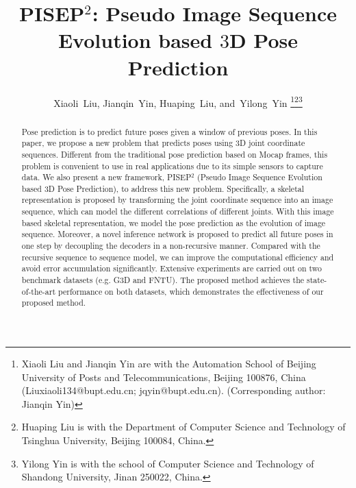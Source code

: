 \documentclass[journal]{IEEEtran}
\begin{document}
\title{PISEP${^2}$: Pseudo Image Sequence Evolution based ${3}$D Pose Prediction}


\author{Xiaoli~Liu,
        Jianqin~Yin,
        Huaping~Liu,
        and~Yilong~Yin \thanks{Xiaoli Liu and Jianqin Yin are with the Automation School of Beijing University of Posts
and Telecommunications, Beijing 100876, China (Liuxiaoli134@bupt.edu.cn; jqyin@bupt.edu.cn). (Corresponding author: Jianqin Yin)}\thanks{Huaping Liu is with the Department of Computer Science and Technology of Tsinghua University, Beijing 100084, China.}\thanks{Yilong Yin is with the school of Computer Science and Technology of
Shandong University, Jinan 250022, China.}}



















\maketitle

\begin{abstract}
Pose prediction is to predict future poses given a window of previous poses. In this paper, we propose a new problem that predicts poses using 3D joint coordinate sequences. Different from the traditional pose prediction based on Mocap frames, this problem is convenient to use in real applications due to its simple sensors to capture data. We also present a new framework, PISEP${^2}$ (Pseudo Image Sequence Evolution based ${3}$D Pose Prediction), to address this new problem. Specifically, a skeletal representation is proposed by transforming the joint coordinate sequence into an image sequence, which can model the different correlations of different joints. With this image based skeletal representation, we model the pose prediction as the evolution of image sequence. Moreover, a novel inference network is proposed to predict all future poses in one step by decoupling the decoders in a non-recursive manner. Compared with the recursive sequence to sequence model, we can improve the computational efficiency and avoid error accumulation significantly. Extensive experiments are carried out on two benchmark datasets (e.g. G${3}$D and FNTU). The proposed method achieves the state-of-the-art performance on both datasets, which demonstrates the effectiveness of our proposed method.
\end{abstract}
\end{document}

